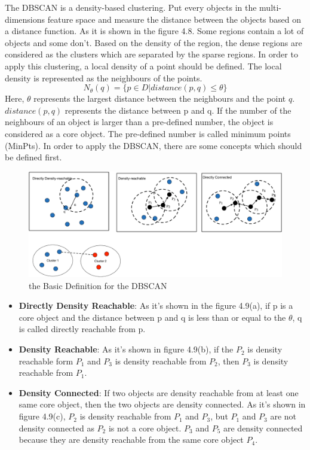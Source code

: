 The DBSCAN is a density-based clustering. Put every objects in the multi-dimensions feature space and measure the distance between the objects based on a distance function. As it is shown in the figure 4.8. Some regions contain a lot of objects and some don't. Based on the density of the region, the dense regions are considered as the clusters which are separated by the sparse regions. In order to apply this clustering, a local density of a point should be defined. The local density is represented as the neighbours of the points.
\begin{equation}
N_\theta(q)=\{p \in D| distance(p,q) \le \theta\}
\end{equation}
Here, $\theta$ represents the largest distance between the neighbours and the point $q$. $distance(p,q)$ represents the distance between p and q. If the number of the neighbours of an object is larger than a pre-defined number, the object is  considered as a core object. The pre-defined number is called minimum points (MinPts).  In order to apply the DBSCAN, there are some concepts which should be defined first.
\begin{figure}
\centering
\includegraphics[scale=0.4]{DBSCANPre.pdf}
\caption{the Basic Definition for the DBSCAN}
\end{figure}
\begin{itemize}
\item \textbf{Directly Density Reachable}:  As it's shown in the figure 4.9(a), if p is a core object and the distance between p and q is less than or equal to the $\theta$, q is called directly reachable from p.  
\item \textbf{Density Reachable}: As it's shown in figure 4.9(b), if the $P_2$ is density reachable form $P_1$ and $P_3$ is density reachable from $P_2$, then $P_3$ is density reachable from $P_1$.  
\item \textbf{Density Connected}: If two objects are density reachable from at least one same core object, then the two objects are density connected. As it's shown in figure 4.9(c), $P_2$ is density reachable from $P_1$ and $P_3$, but $P_1$ and $P_3$ are not density connected as $P_2$ is not a core object. $P_3$ and $P_5$ are density connected because they are density reachable from the same core object $P_4$.
\end{itemize}


